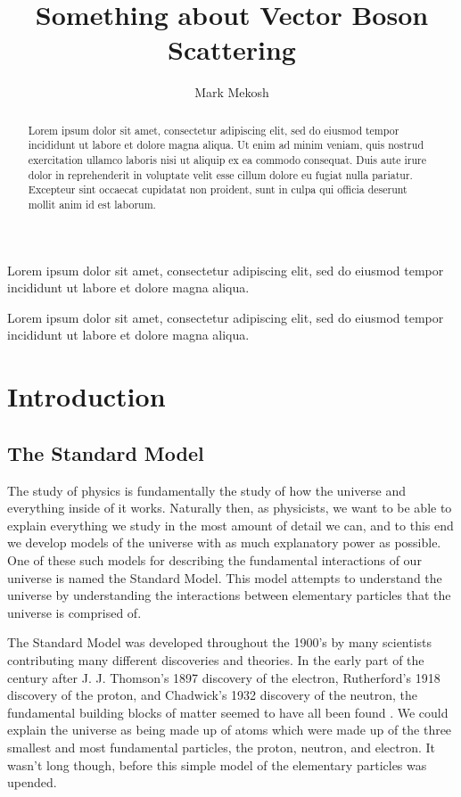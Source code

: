 \documentclass[12pt]{niuthesis}
\title{Something about Vector Boson Scattering}
\author{Mark Mekosh}
\begin{document}
\begin{abstract}
Lorem ipsum dolor sit amet, consectetur adipiscing elit, sed do eiusmod tempor incididunt ut labore et dolore magna aliqua. Ut enim ad minim veniam, quis nostrud exercitation ullamco laboris nisi ut aliquip ex ea commodo consequat. Duis aute irure dolor in reprehenderit in voluptate velit esse cillum dolore eu fugiat nulla pariatur. Excepteur sint occaecat cupidatat non proident, sunt in culpa qui officia deserunt mollit anim id est laborum.
\end{abstract}

\begin{dedication}
Lorem ipsum dolor sit amet, consectetur adipiscing elit, sed do eiusmod tempor incididunt ut labore et dolore magna aliqua.
\end{dedication}

\begin{acknowledgements}
Lorem ipsum dolor sit amet, consectetur adipiscing elit, sed do eiusmod tempor incididunt ut labore et dolore magna aliqua.
\end{acknowledgements}

\MakeThesisPrologue

\chapter{Introduction}
    \section{The Standard Model}
    The study of physics is fundamentally the study of how the universe and everything inside of it works. Naturally then, as physicists, we want to be able to explain everything we study in the most amount of detail we can, and to this end we develop models of the universe with as much explanatory power as possible. One of these such models for describing the fundamental interactions of our universe is named the Standard Model. This model attempts to understand the universe by understanding the interactions between elementary particles that the universe is comprised of. 

    The Standard Model was developed throughout the 1900's by many scientists contributing many different discoveries and theories. In the early part of the century after J. J. Thomson's 1897 discovery of the electron, Rutherford's 1918 discovery of the proton, and Chadwick's 1932 discovery of the neutron, the fundamental building blocks of matter seemed to have all been found \cite{Trefil}. We could explain the universe as being made up of atoms which were made up of the three smallest and most fundamental particles, the proton, neutron, and electron. It wasn't long though, before this simple model of the elementary particles was upended. 
\end{document}
